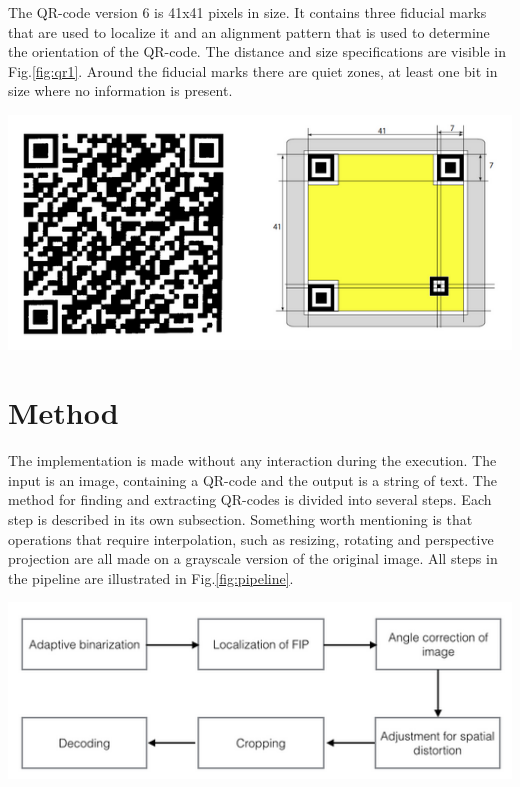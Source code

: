 \documentclass[12pt,a4paper]{article}
\newenvironment{Figure}
  {\par\medskip\noindent\minipage{\linewidth}}
  {\endminipage\par\medskip}
\begin{document}
The QR-code version 6 is 41x41 pixels in size. It contains three fiducial marks that are used to localize it and an alignment pattern that is used to determine the orientation of the QR-code. The distance and size specifications are visible in Fig.\ref{fig:qr1}. Around the fiducial marks there are quiet zones, at least one bit in size where no information is present. 
\begin{Figure}
  \centering
    \includegraphics[width=0.9\linewidth]{./img/qr1.png}
\end{Figure}

\section{Method}
The implementation is made without any interaction during the execution. The input is an image, containing a QR-code and the output is a string of text. The method for finding and extracting QR-codes is divided into several steps. Each step is described in its own subsection. Something worth mentioning is that operations that require interpolation, such as resizing, rotating and perspective projection are all made on a grayscale version of the original image. All steps in the pipeline are illustrated in Fig.\ref{fig:pipeline}. 
\begin{Figure}
  \centering
    \includegraphics[width=1\linewidth]{./img/pipeline.png}
\end{Figure}
\end{document}
